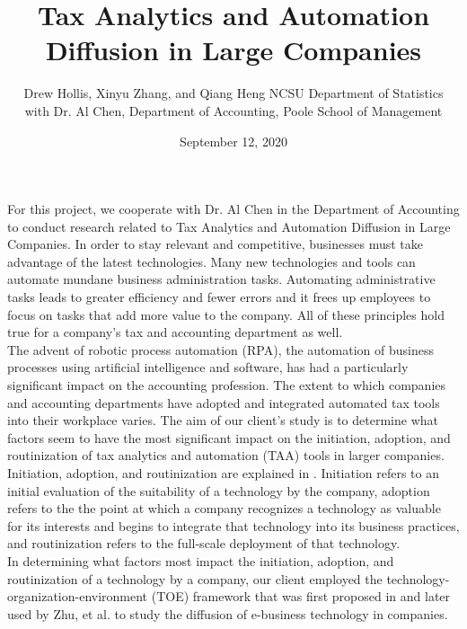 \documentclass[12pt, letterpaper]{article}
\begin{document}
\title{Tax Analytics and Automation Diffusion in Large Companies}
\date{September 12, 2020}
\author{Drew Hollis, Xinyu Zhang, and Qiang Heng NCSU Department of Statistics \\with Dr. Al Chen, Department of Accounting, Poole School of Management}
\maketitle

For this project, we cooperate with Dr. Al Chen in the Department of Accounting to conduct research related to Tax Analytics and Automation Diffusion in Large Companies. In order to stay relevant and competitive, businesses must take advantage of the latest technologies. Many new technologies and tools can automate mundane business administration tasks. Automating administrative tasks leads to greater efficiency and fewer errors and it frees up employees to focus on tasks that add more value to the company. All of these principles hold true for a company's tax and accounting department as well. \\

The advent of robotic process automation (RPA), the automation of business processes using artificial intelligence and software, has had a particularly significant impact on the accounting profession. \cite{mezzio2019robotic} The extent to which companies and accounting departments have adopted and integrated automated tax tools into their workplace varies. The aim of our client's study is to determine what factors seem to have the most significant impact on the initiation, adoption, and routinization of tax analytics and automation (TAA) tools in larger companies. \\

Initiation, adoption, and routinization are explained in \cite{cooper1990information}.  Initiation refers to an initial evaluation of the suitability of a technology by the company, adoption refers to the the point at which a company recognizes a technology as valuable for its interests and begins to integrate that technology into its business practices, and routinization refers to the full-scale deployment of that technology. \\

In determining what factors most impact the initiation, adoption, and routinization of a technology by a company, our client employed the technology-organization-environment (TOE) framework that was first proposed in \cite{tornatzky1990process} and later used by Zhu, et al. \cite{zhu2006process} to study the diffusion of e-business technology in companies.\\
\end{document}
